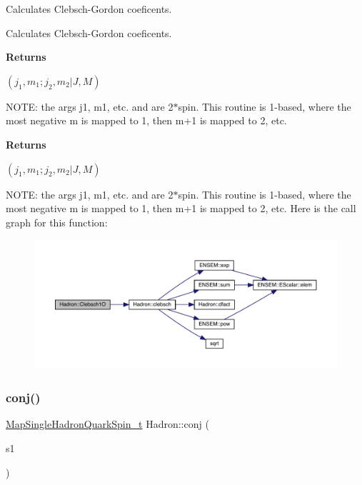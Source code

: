 Calculates Clebsch-\/\+Gordon coeficents. 

Calculates Clebsch-\/\+Gordon coeficents.

{\bfseries{ Returns }}

$\left(j_1,m_1;j_2,m_2|J,M\right) $

N\+O\+TE\+: the args j1, m1, etc. and are 2$\ast$spin. This routine is 1-\/based, where the most negative m is mapped to 1, then m+1 is mapped to 2, etc.

{\bfseries{ Returns }}

$\left(j_1,m_1;j_2,m_2|J,M\right) $

N\+O\+TE\+: the args j1, m1, etc. and are 2$\ast$spin. This routine is 1-\/based, where the most negative m is mapped to 1, then m+1 is mapped to 2, etc. Here is the call graph for this function\+:\nopagebreak
\begin{figure}[H]
\begin{center}
\leavevmode
\includegraphics[width=350pt]{d1/daf/namespaceHadron_a78e0e843ad34636504d3ab3f2280e5e5_cgraph}
\end{center}
\end{figure}
\mbox{\label{namespaceHadron_a5b62c8e194d4e04483d980199eff43fa}} 
\subsubsection{\texorpdfstring{conj()}{conj()}\hspace{0.1cm}{\footnotesize\ttfamily [1/3]}}
{\footnotesize\ttfamily \mbox{\hyperlink{namespaceHadron_a22279e56b59508dc8dd2c8991dc911fd}{Map\+Single\+Hadron\+Quark\+Spin\+\_\+t}} Hadron\+::conj (\begin{DoxyParamCaption}\item[{const \mbox{\hyperlink{namespaceHadron_a22279e56b59508dc8dd2c8991dc911fd}{Map\+Single\+Hadron\+Quark\+Spin\+\_\+t}} \&}]{s1 }\end{DoxyParamCaption})}



